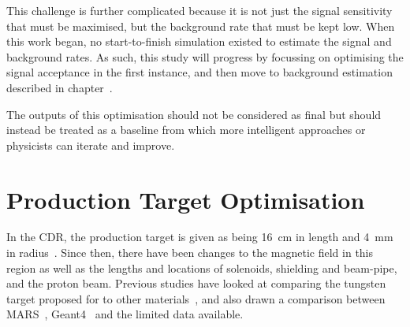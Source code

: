 This challenge is further complicated because it is not just the signal sensitivity that must be maximised, but the background rate that must be kept low.
When this work began, no start-to-finish simulation existed to estimate the signal and background rates.
As such, this study will progress by focussing on optimising the signal acceptance in the first instance, and then move to background estimation described in chapter~.

The outputs of this optimisation should not be considered as final but should instead be treated as a baseline from which more intelligent approaches or physicists can iterate and improve.


\section{Production Target Optimisation}
In the \phaseII \ac{CDR}, the production target is given as being 16~cm in
length and 4~mm in radius~\cite{CDRphase2}.  Since then, there have been changes to
the magnetic field in this region as well as the lengths and locations of
solenoids, shielding and beam-pipe, and the proton beam.  Previous studies have
looked at comparing the tungsten target proposed for \phaseII to other
materials~\cite{AEdmondsThesis}, and also drawn a comparison between
MARS~\cite{MARS1995}, Geant4~\cite{Geant42003} and the limited data available.

